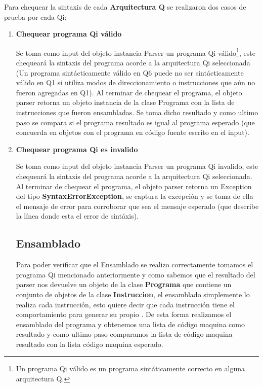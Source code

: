 Para chequear la sintaxis de cada \textbf{Arquitectura Q} se realizaron dos casos de prueba por cada Qi:
\begin{enumerate}
\item \textbf{Chequear programa Qi válido}

Se toma como input del objeto instancia Parser un programa Qi válido\footnote{Un programa Qi válido es un programa sintáticamente correcto en alguna arquitectura Q.}, este chequeará la sintaxis del programa acorde a la arquitectura Qi seleccionada (Un programa sintácticamente válido en Q6 puede no ser sintácticamente válido en Q1 si utiliza modos de direccionamiento o instrucciones que aún no fueron agregadas en Q1). Al terminar de chequear el programa, el objeto parser retorna un objeto instancia de la clase Programa con la lista de instrucciones que fueron ensambladas. 
Se toma dicho resultado y como ultimo paso se compara si el programa resultado es igual al programa esperado (que concuerda en objetos con el programa en código fuente escrito en el input).


\item \textbf{Chequear programa Qi es invalido} 

Se toma como input del objeto instancia Parser un programa Qi invalido, este chequeará la sintaxis del programa acorde a la arquitectura Qi seleccionada. Al terminar de chequear el programa, el objeto parser retorna un Exception del tipo \textbf{SyntaxErrorException}, se captura la excepción y se toma de ella el mensaje de error para corroborar que sea el mensaje esperado (que describe la línea donde esta el error de sintáxis).


\subsection{Ensamblado}

Para poder verificar que el Ensamblado se realizo correctamente tomamos el programa Qi mencionado anteriormente y como sabemos que el resultado del parser nos devuelve un objeto de la clase \textbf{Programa} que contiene un conjunto de objetos de la clase \textbf{Instruccion}, el ensamblado simplemente lo realiza cada instrucción, esto quiere decir que cada instrucción tiene el comportamiento para generar su propio \codmaq. De esta forma realizamos el ensamblado del programa y obtenemos una lista de código maquina como resultado y como ultimo paso comparamos la lista de código maquina resultado con la lista código maquina esperado.


\end{enumerate}

